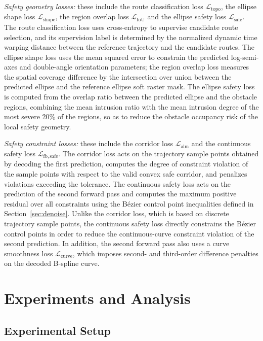 \documentclass[journal]{IEEEtran}
\begin{document}
\emph{Safety geometry losses:} these include the route classification loss $\mathcal L_{\mathrm{topo}}$, the ellipse shape loss $\mathcal L_{\mathrm{shape}}$, the region overlap loss $\mathcal L_{\mathrm{IoU}}$ and the ellipse safety loss $\mathcal L_{\mathrm{safe}}$. The route classification loss uses cross-entropy to supervise candidate route selection, and its supervision label is determined by the normalized dynamic time warping distance between the reference trajectory and the candidate routes. The ellipse shape loss uses the mean squared error to constrain the predicted log-semi-axes and double-angle orientation parameters; the region overlap loss measures the spatial coverage difference by the intersection over union between the predicted ellipse and the reference ellipse soft raster mask. The ellipse safety loss is computed from the overlap ratio between the predicted ellipse and the obstacle regions, combining the mean intrusion ratio with the mean intrusion degree of the most severe 20\% of the regions, so as to reduce the obstacle occupancy risk of the local safety geometry.

\emph{Safety constraint losses:} these include the corridor loss $\mathcal L_{\mathrm{alm}}$ and the continuous safety loss $\mathcal L_{\mathrm{fb,safe}}$. The corridor loss acts on the trajectory sample points obtained by decoding the first prediction, computes the degree of constraint violation of the sample points with respect to the valid convex safe corridor, and penalizes violations exceeding the tolerance. The continuous safety loss acts on the prediction of the second forward pass and computes the maximum positive residual over all constraints using the B\'ezier control point inequalities defined in Section~\ref{sec:denoise}. Unlike the corridor loss, which is based on discrete trajectory sample points, the continuous safety loss directly constrains the B\'ezier control points in order to reduce the continuous-curve constraint violation of the second prediction. In addition, the second forward pass also uses a curve smoothness loss $\mathcal L_{\mathrm{curve}}$, which imposes second- and third-order difference penalties on the decoded B-spline curve.

\section{Experiments and Analysis}

\subsection{Experimental Setup}
\end{document}
